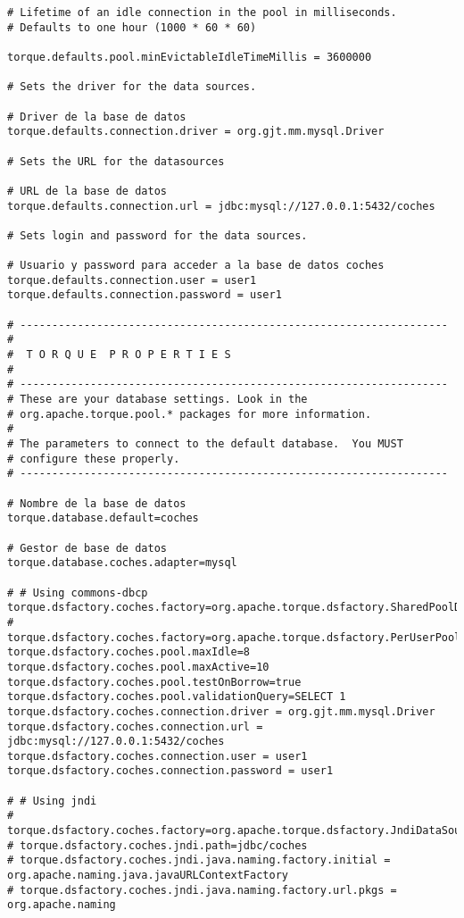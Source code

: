 \begin{lstlisting}
# Lifetime of an idle connection in the pool in milliseconds.
# Defaults to one hour (1000 * 60 * 60)

torque.defaults.pool.minEvictableIdleTimeMillis = 3600000

# Sets the driver for the data sources.

# Driver de la base de datos
torque.defaults.connection.driver = org.gjt.mm.mysql.Driver

# Sets the URL for the datasources

# URL de la base de datos
torque.defaults.connection.url = jdbc:mysql://127.0.0.1:5432/coches

# Sets login and password for the data sources.

# Usuario y password para acceder a la base de datos coches
torque.defaults.connection.user = user1
torque.defaults.connection.password = user1

# -------------------------------------------------------------------
#
#  T O R Q U E  P R O P E R T I E S
#
# -------------------------------------------------------------------
# These are your database settings. Look in the
# org.apache.torque.pool.* packages for more information.
#
# The parameters to connect to the default database.  You MUST
# configure these properly.
# -------------------------------------------------------------------

# Nombre de la base de datos
torque.database.default=coches

# Gestor de base de datos
torque.database.coches.adapter=mysql

# # Using commons-dbcp
torque.dsfactory.coches.factory=org.apache.torque.dsfactory.SharedPoolDataSourceFactory
# torque.dsfactory.coches.factory=org.apache.torque.dsfactory.PerUserPoolDataSourceFactory
torque.dsfactory.coches.pool.maxIdle=8
torque.dsfactory.coches.pool.maxActive=10
torque.dsfactory.coches.pool.testOnBorrow=true
torque.dsfactory.coches.pool.validationQuery=SELECT 1
torque.dsfactory.coches.connection.driver = org.gjt.mm.mysql.Driver
torque.dsfactory.coches.connection.url = jdbc:mysql://127.0.0.1:5432/coches
torque.dsfactory.coches.connection.user = user1
torque.dsfactory.coches.connection.password = user1

# # Using jndi
# torque.dsfactory.coches.factory=org.apache.torque.dsfactory.JndiDataSourceFactory
# torque.dsfactory.coches.jndi.path=jdbc/coches
# torque.dsfactory.coches.jndi.java.naming.factory.initial = org.apache.naming.java.javaURLContextFactory
# torque.dsfactory.coches.jndi.java.naming.factory.url.pkgs = org.apache.naming


\end{lstlisting}
